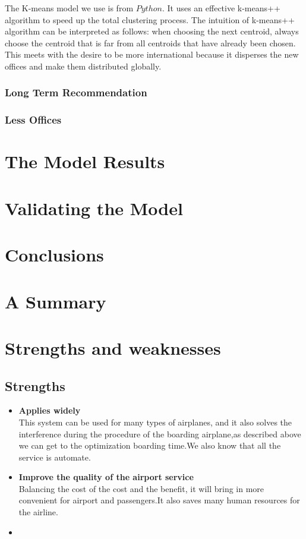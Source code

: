 \documentclass{mcmthesis}
\begin{document}
  \indent The K-means model we use is from $Python$. It uses an effective k-means++ algorithm to speed up the total clustering process. The intuition of k-means++ algorithm can be interpreted as follows: when choosing the next centroid, always choose the centroid that is far from all centroids that have already been chosen. This meets with the desire to be more international because it disperses the new offices and make them distributed globally. 

  \subsubsection{Long Term Recommendation}
  \subsubsection{Less Offices}
  


\section{The Model Results}

\section{Validating the Model}

\section{Conclusions}

\section{A Summary}

\section{Strengths and weaknesses}

\subsection{Strengths}
\begin{itemize}
\item \textbf{Applies widely}\\
This  system can be used for many types of airplanes, and it also
solves the interference during  the procedure of the boarding
airplane,as described above we can get to the  optimization
boarding time.We also know that all the service is automate.
\item \textbf{Improve the quality of the airport service}\\
Balancing the cost of the cost and the benefit, it will bring in
more convenient  for airport and passengers.It also saves many
human resources for the airline. \item \textbf{}
\end{itemize}
\end{document}
